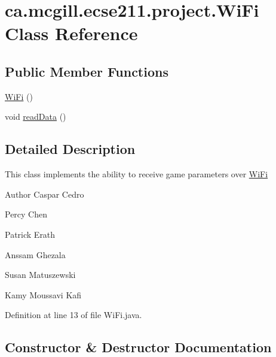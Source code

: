 \hypertarget{classca_1_1mcgill_1_1ecse211_1_1project_1_1_wi_fi}{}\section{ca.\+mcgill.\+ecse211.\+project.\+Wi\+Fi Class Reference}
\label{classca_1_1mcgill_1_1ecse211_1_1project_1_1_wi_fi}
\subsection*{Public Member Functions}
\begin{DoxyCompactItemize}
\item 
\hyperlink{classca_1_1mcgill_1_1ecse211_1_1project_1_1_wi_fi_a0f404abcbaaf147bce3479f6d6e9015a}{Wi\+Fi} ()
\item 
void \hyperlink{classca_1_1mcgill_1_1ecse211_1_1project_1_1_wi_fi_aa40dba958b0bb4cc8cb5aeae636e3b08}{read\+Data} ()
\end{DoxyCompactItemize}


\subsection{Detailed Description}
This class implements the ability to receive game parameters over \hyperlink{classca_1_1mcgill_1_1ecse211_1_1project_1_1_wi_fi}{Wi\+Fi}

\begin{DoxyAuthor}{Author}
Caspar Cedro 

Percy Chen 

Patrick Erath 

Anssam Ghezala 

Susan Matuszewski 

Kamy Moussavi Kafi 
\end{DoxyAuthor}


Definition at line 13 of file Wi\+Fi.\+java.



\subsection{Constructor \& Destructor Documentation}
\mbox{\label{classca_1_1mcgill_1_1ecse211_1_1project_1_1_wi_fi_a0f404abcbaaf147bce3479f6d6e9015a}} 
